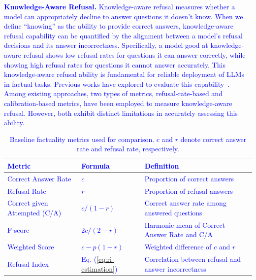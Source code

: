 \documentclass{article} %
\theoremstyle{definition}
\newcommand{\wigglyblue}[1]{\textcolor{blue}{#1}}
\begin{document}
\noindent\wigglyblue{\textbf{Knowledge-Aware Refusal.} 
Knowledge-aware refusal measures whether a model can appropriately decline to answer questions it doesn't know.
When we define ``knowing'' as the ability to provide correct answers, knowledge-aware refusal capability can be quantified by the alignment between a model's refusal decisions and its answer incorrectness.
\todo[color=orange!40]{Zb1L - W1}
Specifically, a model good at knowledge-aware refusal shows low refusal rates for questions it can answer correctly, while showing high refusal rates for questions it cannot answer accurately.
This knowledge-aware refusal ability is fundamental for reliable deployment of LLMs in factual tasks. 
Previous works have explored to evaluate this capability~\citep{cheng2024aiassistantsknowdont, kapoor2024large}. 
Among existing approaches, two types of metrics, refusal-rate-based and calibration-based metrics, have been employed to measure knowledge-aware refusal. 
However, both exhibit distinct limitations in accurately assessing this ability.}

\vspace{-0.5em}
\begin{table}[thbp]
    \centering
    \footnotesize
    \caption{\wigglyblue{Baseline factuality metrics used for comparison. $c$ and $r$ denote correct answer rate and refusal rate, respectively.}}
    \vspace{-0.5em}
    \begin{tabularx}{\textwidth}{l l l}
        \toprule
        \wigglyblue{\textbf{Metric}} & \wigglyblue{\textbf{Formula}} & \wigglyblue{\textbf{Definition}} \\
        \midrule
        \wigglyblue{Correct Answer Rate} & \wigglyblue{$c$} & \wigglyblue{Proportion of correct answers} \\
        \wigglyblue{Refusal Rate} & \wigglyblue{$r$} & \wigglyblue{Proportion of refusal answers} \\
        \wigglyblue{Correct given Attempted (C/A)} & \wigglyblue{$c/(1 - r)$} & \wigglyblue{Correct answer rate among answered questions} \\
        \wigglyblue{F-score} & \wigglyblue{$2c/(2 - r)$} & \wigglyblue{Harmonic mean of Correct Answer Rate and C/A} \\
        \wigglyblue{Weighted Score} & \wigglyblue{$c - p(1-r)$} & \wigglyblue{Weighted difference of $c$ and $r$} \\
        \midrule
        \wigglyblue{Refusal Index} & \wigglyblue{Eq. (\ref{eq:ri-estimation})} & \wigglyblue{Correlation between refusal and answer incorrectness} \\
        \bottomrule
    \end{tabularx}
    \label{tab:baseline_metrics}
    \vspace{-0.5em}
\end{table}
\end{document}
